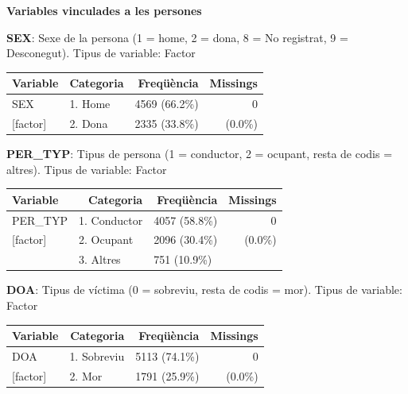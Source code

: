 \documentclass[12pt,longbibliography]{article}
\theoremstyle{definition}
\theoremstyle{remark}
\begin{document}
\textbf{Variables vinculades a les persones}


\textbf{SEX}: Sexe de la persona (1 = home, 2 = dona, 8 = No registrat, 9 = Desconegut). Tipus de variable: Factor


\begin{table}[H]
\centering
\begin{tabular}{llll}
\hline
Variable & \multicolumn{1}{r}{Categoria} & \multicolumn{1}{r}{Freqüència} & \multicolumn{1}{r}{Missings} \\ \hline
SEX    & 1. Home  & 4569 (66.2\%) & \multicolumn{1}{r}{0} \\
{[}factor{]} & 2. Dona   & 2335 (33.8\%) & \multicolumn{1}{r}{(0.0\%)}          \\\hline
\end{tabular}
\end{table}


\textbf{PER\_TYP}: Tipus de persona (1 = conductor, 2 = ocupant, resta de codis = altres). Tipus de variable: Factor


\begin{table}[H]
\centering
\begin{tabular}{llll}
\hline
Variable & \multicolumn{1}{r}{Categoria} & \multicolumn{1}{r}{Freqüència} & \multicolumn{1}{r}{Missings} \\ \hline
PER\_TYP    & 1. Conductor  & 4057 (58.8\%) & \multicolumn{1}{r}{0} \\
{[}factor{]}      & 2. Ocupant  & 2096 (30.4\%) & \multicolumn{1}{r}{(0.0\%)} \\
                     & 3. Altres   & 751 (10.9\%) & \multicolumn{1}{r}{}          \\\hline
\end{tabular}
\end{table}


\textbf{DOA}: Tipus de víctima (0 = sobreviu, resta de codis = mor). Tipus de variable: Factor


\begin{table}[H]
\centering
\begin{tabular}{llll}
\hline
Variable & \multicolumn{1}{r}{Categoria} & \multicolumn{1}{r}{Freqüència} & \multicolumn{1}{r}{Missings} \\ \hline
DOA    & 1. Sobreviu  & 5113 (74.1\%) & \multicolumn{1}{r}{0} \\
{[}factor{]} & 2. Mor   & 1791 (25.9\%) & \multicolumn{1}{r}{(0.0\%)}          \\\hline
\end{tabular}
\end{table}
\end{document}

